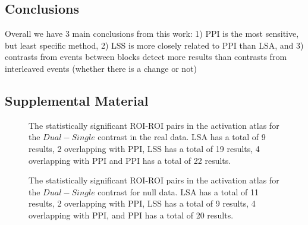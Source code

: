 \documentclass[phd,appendix,figures]{uithesis}
\begin{document}
\subsection{Conclusions}
Overall we have 3 main conclusions from this work:
1) PPI is the most sensitive, but least specific method,
2) LSS is more closely related to PPI than LSA, and
3) contrasts from events between blocks detect more results than contrasts
from interleaved events (whether there is a change or not)

\subsection{Supplemental Material}

\begin{figure}[H]
  \centering


  \caption{
      The statistically significant ROI-ROI pairs in the activation atlas
      for the $Dual - Single$ contrast in the real data.
      LSA has a total of 9 results, 2 overlapping with PPI,
      LSS has a total of 19 results, 4 overlapping with PPI and
      PPI has a total of 22 results.
  }
  \label{fig:data-real_type-brain_atlas-activation_contrast-dualxsingle}
\end{figure}

\begin{figure}[H]
  \ContinuedFloat
  \centering


  \caption{
      The statistically significant ROI-ROI pairs in the activation atlas
      for the $Dual - Single$ contrast for null data.
      LSA has a total of 11 results, 2 overlapping with PPI,
      LSS has a total of 9 results, 4 overlapping with PPI,
      and PPI has a total of 20 results.
  }
  \label{fig:data-null_type-brain_atlas-activation_contrast-dualxsingle}
\end{figure}
\end{document}
